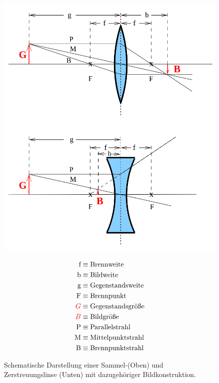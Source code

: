 \begin{figure}
\begin{minipage}{0.5\textwidth}
    \includegraphics[width=\textwidth]{data/Normale_Linsen.png}
\end{minipage}
\begin{minipage}{0.5\textwidth}
\begin{align*}
    \text{f} & \equiv \text{Brennweite} \\
    \text{b} & \equiv \text{Bildweite} \\
    \text{g} & \equiv \text{Gegenstandsweite} \\
    \text{F} & \equiv \text{Brennpunkt} \\
    \textcolor{red}{G} & \equiv \text{Gegenstandsgröße} \\
    \textcolor{red}{B} & \equiv \text{Bildgröße} \\
    \text{P} & \equiv \text{Parallelstrahl} \\
    \text{M} & \equiv \text{Mittelpunktstrahl} \\
    \text{B} & \equiv \text{Brennpunktstrahl}
\end{align*}
\end{minipage}
\caption{Schematische Darstellung einer Sammel-(Oben) und Zerstreuungslinse (Unten) mit dazugehöriger Bildkonstruktion.}
\label{fig:Normal}
\end{figure}

